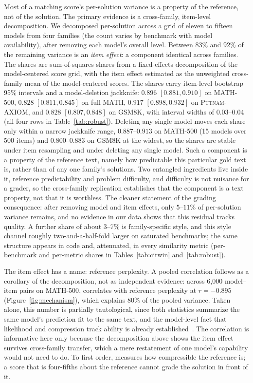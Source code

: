 Most of a matching score's per-solution variance is a property of the reference, not of the solution.
The primary evidence is a cross-family, item-level decomposition.
We decomposed per-solution \tfa{} across a grid of eleven to fifteen models from four families (the count varies by benchmark with model availability), after removing each model's overall level.
Between $83\%$ and $92\%$ of the remaining variance is an \emph{item effect}: a component identical across families.
The shares are sum-of-squares shares from a fixed-effects decomposition of the model-centered score grid, with the item effect estimated as the unweighted cross-family mean of the model-centered scores.
The shares carry item-level bootstrap 95\% intervals and a model-deletion jackknife: $0.896$ $[0.881, 0.910]$ on \textsc{MATH-500}, $0.828$ $[0.811, 0.845]$ on full \textsc{MATH}, $0.917$ $[0.898, 0.932]$ on \textsc{Putnam-AXIOM}, and $0.828$ $[0.807, 0.848]$ on \textsc{GSM8K}, with interval widths of $0.03$--$0.04$ (all four rows in Table~\ref{tab:robust}).
Deleting any single model moves each share only within a narrow jackknife range, $0.887$--$0.913$ on \textsc{MATH-500} (15 models over 500 items) and $0.800$--$0.883$ on \textsc{GSM8K} at the widest, so the shares are stable under item resampling and under deleting any single model.
Such a component is a property of the reference text, namely how predictable this particular gold text is, rather than of any one family's solutions.
Two entangled ingredients live inside it, reference predictability and problem difficulty, and difficulty is not nuisance for a grader, so the cross-family replication establishes that the component is a text property, not that it is worthless.
The cleaner statement of the grading consequence: after removing model and item effects, only $5$--$11\%$ of per-solution variance remains, and no evidence in our data shows that this residual tracks quality.
A further share of about $3$--$7\%$ is family-specific style, and this style channel roughly two-and-a-half-fold larger on saturated benchmarks; the same structure appears in code and, attenuated, in every similarity metric (per-benchmark and per-metric shares in Tables~\ref{tab:citwin} and~\ref{tab:robust}).

The item effect has a name: reference perplexity.
A pooled correlation follows as a corollary of the decomposition, not as independent evidence: across 6{,}000 model--item pairs on \textsc{MATH-500}, \tfa{} correlates with reference perplexity at $r = -0.895$ (Figure~\ref{fig:mechanism}), which explains $80\%$ of the pooled variance.
Taken alone, this number is partially tautological, since both statistics summarize the same model's prediction fit to the same text, and the model-level fact that likelihood and compression track ability is already established~\cite{huang2024compression,schaeffer2025pretraining,koh2025rbridge}.
The correlation is informative here only because the decomposition above shows the item effect survives cross-family transfer, which a mere restatement of one model's capability would not need to do.
To first order, \tfa{} measures how compressible the reference is; a score that is four-fifths about the reference cannot grade the solution in front of it.

